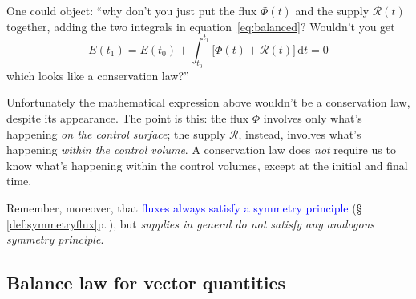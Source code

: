\documentclass[a4paper,12pt,%
onecolumn,oneside,%
british%
]{memoir}
\newcommand*{\di}{\mathrm{d}}%
\renewcommand*{\|}[1][]{\nonscript\:#1\vert\nonscript\:\mathopen{}}
\newcommand*{\sect}{\S}%
\renewcommand*{\autoref}[3][\sect\,\ref]{\textcolor{blue}{#3} {\color{blue}\scriptsize(\faIcon[regular]{eye}\;#1{#2}\;p.\,\pageref{#2})}}
\newcommand*{\yti}{t_{0}}
\newcommand*{\ytf}{t_{1}}
\newcommand*{\dt}{\di t}
\newcommand*{\yE}{E}
\newcommand*{\yH}{\varPhi}%
\newcommand*{\yR}{\mathcal{R}}%
\begin{document}
\begin{warning}
  One could object: \enquote{why don't you just put the flux $\yH(t)$ and the supply $\yR(t)$ together, adding the two integrals in equation~\eqref{eq:balanced}? Wouldn't you get
  \begin{equation*}
    \yE(\ytf) = \yE(\yti) + \int_{\yti}^{\ytf}\!\!\bigl[\yH(t)+\yR(t)\bigr]\, \dt = 0
  \end{equation*}
  which looks like a conservation law?}

\medskip

Unfortunately the mathematical expression above wouldn't be a conservation law, despite its appearance. The point is this: the flux $\yH$ involves only what's happening \emph{on the control surface}; the supply $\yR$, instead, involves what's happening \emph{within the control volume}. A conservation law does \emph{not} require us to know what's happening within the control volumes, except at the initial and final time.

\smallskip

Remember, moreover, that \autoref{def:symmetryflux}{fluxes always satisfy a symmetry principle}, but \emph{supplies in general do not satisfy any analogous symmetry principle}.
\end{warning}



\subsection{Balance law for vector quantities}
\label{sec:balance_laws_vect}
\end{document}
